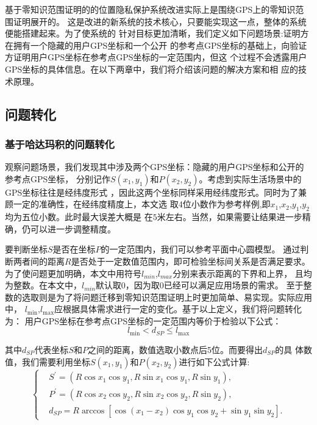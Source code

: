 \documentclass[zihao=-4]{ctexart}
\begin{document}
基于零知识范围证明的的位置隐私保护系统改进实际上是围绕GPS上的零知识范围证明展开的。
这是改进的新系统的技术核心，只要能实现这一点，整体的系统便能搭建起来。为了使系统的
针对目标更加清晰，我们定义如下问题场景:证明方在拥有一个隐藏的用户GPS坐标和一个公开
的参考点GPS坐标的基础上，向验证方证明用户GPS坐标在参考点GPS坐标的一定范围内，但这
个过程不会透露用户GPS坐标的具体信息。在以下两章中，我们将介绍该问题的解决方案和相
应的技术原理。
\subsection{问题转化}
\subsubsection{基于哈达玛积的问题转化}
观察问题场景，我们发现其中涉及两个GPS坐标：隐藏的用户GPS坐标和公开的参考点GPS坐标，
分别记作$S(x_1,y_1)$和$P(x_2,y_2)$。考虑到实际生活场景中的GPS坐标往往是经纬度形式
，因此这两个坐标同样采用经纬度形式。同时为了兼顾一定的准确性，在经纬度精度上，本文选
取4位小数作为参考样例,即$x_1$,$x_2$,$y_1$,$y_2$均为五位小数。此时最大误差大概是
在$5$米左右。当然，如果需要让结果进一步精确，仍可以进一步调整精度。\par
要判断坐标$S$是否在坐标$P$的一定范围内，我们可以参考平面中心圆模型。
通过判断两者间的距离$R$是否处于一定数值范围内，即可检验坐标间关系是否满足要求。
为了使问题更加明确，本文中用符号$l_{min}$,$l_{max}$分别来表示距离的下界和上界，
且均为整数。在本文中，$l_{min}$默认取$0$，因为取$0$已经可以满足应用场景的需求。
至于整数的选取则是为了将问题迁移到零知识范围证明上时更加简单、易实现。实际应用中，
$l_{\min}$,$l_{\max}$应根据具体需求进行一定的变化。基于以上定义，我们将问题转化为：
用户GPS坐标在参考点GPS坐标的一定范围内等价于检验以下公式：
\begin{equation}l_{\min}< d_{SP}\leq l_{\max}\end{equation}\par
其中$d_{SP}$代表坐标$S$和$P$之间的距离，数值选取小数点后5位。而要得出$d_{SP}$的具
体数值，我们需要利用坐标$S(x_1,y_1)$和$P(x_2,y_2)$进行如下公式计算:
\begin{equation}
  \begin{cases}
    &S^{\prime}=(R\cos x_1\cos y_1,R\sin x_1\cos y_1,R\sin y_1),\\
    &P^{\prime}=(R\cos x_2\cos y_2,R\sin x_2\cos y_2,R\sin y_2),\\
    &d_{SP}=R\arccos[\cos(x_1-x_2)\cos y_1\cos y_2+\sin y_1\sin y_2].
  \end{cases}
\end{equation}\par
\end{document}
